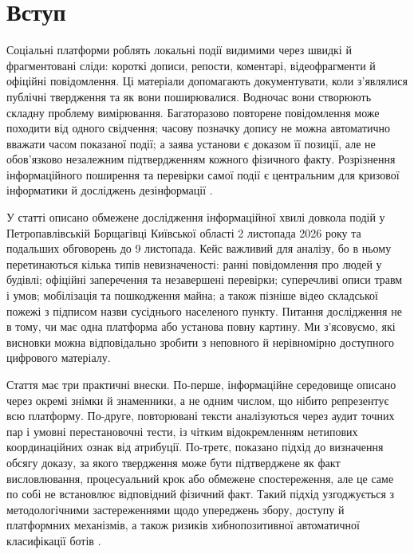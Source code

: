 \section{Вступ}

Соціальні платформи роблять локальні події видимими через швидкі й фрагментовані сліди: короткі дописи, репости, коментарі, відеофрагменти й офіційні повідомлення. Ці матеріали допомагають документувати, коли з'являлися публічні твердження та як вони поширювалися. Водночас вони створюють складну проблему вимірювання. Багаторазово повторене повідомлення може походити від одного свідчення; часову позначку допису не можна автоматично вважати часом показаної події; а заява установи є доказом її позиції, але не обов'язково незалежним підтвердженням кожного фізичного факту. Розрізнення інформаційного поширення та перевірки самої події є центральним для кризової інформатики й досліджень дезінформації \citep{lazer2018science,vosoughi2018spread,han2019rumour}.

У статті описано обмежене дослідження інформаційної хвилі довкола подій у Петропавлівській Борщагівці Київської області 2 листопада 2026 року та подальших обговорень до 9 листопада. Кейс важливий для аналізу, бо в ньому перетинаються кілька типів невизначеності: ранні повідомлення про людей у будівлі; офіційні заперечення та незавершені перевірки; суперечливі описи травм і умов; мобілізація та пошкодження майна; а також пізніше відео складської пожежі з підписом назви сусіднього населеного пункту. Питання дослідження не в тому, чи має одна платформа або установа повну картину. Ми з'ясовуємо, які висновки можна відповідально зробити з неповного й нерівномірно доступного цифрового матеріалу.

Стаття має три практичні внески. По-перше, інформаційне середовище описано через окремі знімки й знаменники, а не одним числом, що нібито репрезентує всю платформу. По-друге, повторювані тексти аналізуються через аудит точних пар і умовні перестановочні тести, із чітким відокремленням нетипових координаційних ознак від атрибуції. По-третє, показано підхід до визначення обсягу доказу, за якого твердження може бути підтверджене як факт висловлювання, процесуальний крок або обмежене спостереження, але це саме по собі не встановлює відповідний фізичний факт. Такий підхід узгоджується з методологічними застереженнями щодо упереджень збору, доступу й платформних механізмів, а також ризиків хибнопозитивної автоматичної класифікації ботів \citep{olteanu2019social,rauchfleisch2020false,vicente2023sampling}.


